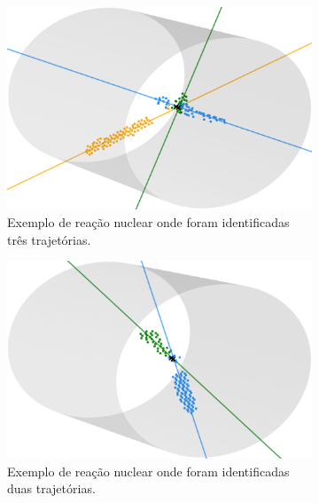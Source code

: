 \documentclass[a4paper,12pt,oneside]{book}
\begin{document}
\begin{figure}[H]
\centering
    \begin{subfigure}[b]{\textwidth}
        \centering
        \includegraphics[scale = 0.3]{figs/results_ex_3_tracks_41.png}
        \caption{Exemplo de reação nuclear onde foram identificadas três trajetórias.}
        \label{subfig:res_exemplo_3_tracks}
    \end{subfigure}%
    \hfill
    \begin{subfigure}[t]{0.45\textwidth}
        \centering
        \includegraphics[scale=0.5, width=.95\columnwidth]{figs/reac_alpha_alpha_num_212.png}
        \caption{Exemplo de reação nuclear onde foram identificadas duas trajetórias.}
        \label{subfig:res_exemplo_2_tracks}
    \end{subfigure}%
    \hspace{0.5cm}
    \begin{subfigure}[t]{0.45\textwidth}
        \centering

\end{subfigure}
\end{figure}
\end{document}
